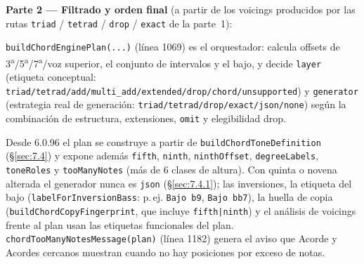 \documentclass[a4paper,11pt,oneside]{report}
\newcommand{\Sref}[1]{\S\ref{#1}}
\begin{document}
\textbf{Parte 2 --- Filtrado y orden final} (a partir de los voicings producidos por las rutas \texttt{triad} / \texttt{tetrad} / \texttt{drop} / \texttt{exact} de la parte~1):

\begin{center}
\end{center}

\lstinline!buildChordEnginePlan(...)! (línea 1069) es el orquestador: calcula offsets de 3\textsuperscript{a}/5\textsuperscript{a}/7\textsuperscript{a}/voz superior, el conjunto de intervalos y el bajo, y decide \lstinline!layer! (etiqueta conceptual: \lstinline!triad/tetrad/add/multi_add/extended/drop/chord/unsupported!) y \lstinline!generator! (estrategia real de generación: \lstinline!triad/tetrad/drop/exact/json/none!) según la combinación de estructura, extensiones, \lstinline!omit! y elegibilidad drop.

Desde 6.0.96 el plan se construye a partir de \lstinline!buildChordToneDefinition! (\Sref{sec:7.4}) y expone además \lstinline!fifth!, \lstinline!ninth!, \lstinline!ninthOffset!, \lstinline!degreeLabels!, \lstinline!toneRoles! y \lstinline!tooManyNotes! (más de 6 clases de altura). Con quinta o novena alterada el generador nunca es \lstinline!json! (\Sref{sec:7.4.1}); las inversiones, la etiqueta del bajo (\lstinline!labelForInversionBass!: p.\,ej. \lstinline!Bajo b9!, \lstinline!Bajo bb7!), la huella de copia (\lstinline!buildChordCopyFingerprint!, que incluye \lstinline!fifth|ninth!) y el análisis de voicings frente al plan usan las etiquetas funcionales del plan. \lstinline!chordTooManyNotesMessage(plan)! (línea 1182) genera el aviso que Acorde y Acordes cercanos muestran cuando no hay posiciones por exceso de notas.
\end{document}
